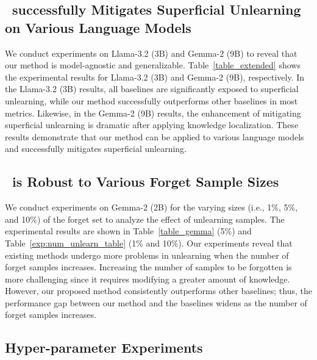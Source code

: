 \subsection{\ourmodel~successfully Mitigates Superficial Unlearning on Various Language Models}
\label{apx:extend_exp}
We conduct experiments on Llama-3.2 (3B) and Gemma-2 (9B) to reveal that our method is model-agnostic and generalizable.
Table~\ref{table_extended} shows the experimental results for Llama-3.2 (3B) and Gemma-2 (9B), respectively.
In the Llama-3.2 (3B) results, all baselines are significantly exposed to superficial unlearning, while our method successfully outperforms other baselines in most metrics.
Likewise, in the Gemma-2 (9B) results, the enhancement of mitigating superficial unlearning is dramatic after applying knowledge localization.
These results demonstrate that our method can be applied to various language models and successfully mitigates superficial unlearning.







\subsection{\ourmodel~is Robust to Various Forget Sample Sizes} %
\label{apx:data_size}
We conduct experiments on Gemma-2 (2B) for the varying sizes (i.e., 1\%, 5\%, and 10\%) of the forget set to analyze the effect of unlearning samples.
The experimental results are shown in Table~\ref{table_gemma} (5\%) and Table~\ref{exp:num_unlearn_table} (1\% and 10\%).
Our experiments reveal that existing methods undergo more problems in unlearning when the number of forget samples increases.
Increasing the number of samples to be forgotten is more challenging since it requires modifying a greater amount of knowledge.
However, our proposed method consistently outperforms other baselines; thus, the performance gap between our method and the baselines widens as the number of forget samples increases.





\subsection{Hyper-parameter Experiments}
\label{apx:hyperparams}
